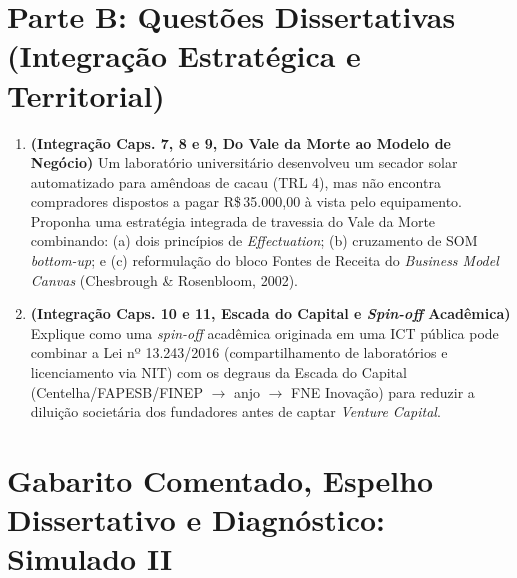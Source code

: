 \section*{Parte B: Questões Dissertativas (Integração Estratégica e Territorial)}

\begin{enumerate}[leftmargin=1.5em, itemsep=8pt, start=9]
  \item \textbf{(Integração Caps. 7, 8 e 9, Do Vale da Morte ao Modelo de Negócio)} Um laboratório universitário desenvolveu um secador solar automatizado para amêndoas de cacau (TRL 4), mas não encontra compradores dispostos a pagar R\$\,35.000,00 à vista pelo equipamento. Proponha uma estratégia integrada de travessia do Vale da Morte combinando: (a) dois princípios de \textit{Effectuation}; (b) cruzamento de SOM \textit{bottom-up}; e (c) reformulação do bloco Fontes de Receita do \textit{Business Model Canvas} (Chesbrough \& Rosenbloom, 2002).
  \espacoResolucao[2.8cm]

  \item \textbf{(Integração Caps. 10 e 11, Escada do Capital e \textit{Spin-off} Acadêmica)} Explique como uma \textit{spin-off} acadêmica originada em uma ICT pública pode combinar a Lei nº 13.243/2016 (compartilhamento de laboratórios e licenciamento via NIT) com os degraus da Escada do Capital (Centelha/FAPESB/FINEP $\to$ anjo $\to$ FNE Inovação) para reduzir a diluição societária dos fundadores antes de captar \textit{Venture Capital}.
  \espacoResolucao[2.8cm]
\end{enumerate}

\clearpage
\section*{Gabarito Comentado, Espelho Dissertativo e Diagnóstico: Simulado II}

